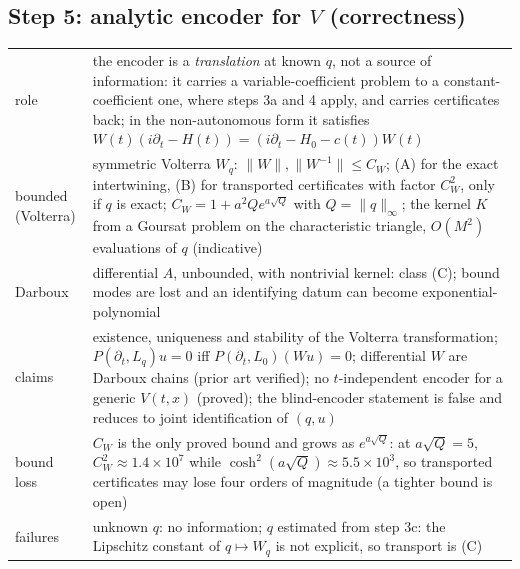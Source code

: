 \subsection*{Step 5: analytic encoder for $V$ (correctness)}
\begin{tabular}{@{}p{2.2cm}p{9.6cm}@{}}
\toprule
role & the encoder is a \emph{translation} at known $q$, not a source of information: it carries a variable-coefficient problem to a constant-coefficient one, where steps 3a and 4 apply, and carries certificates back; in the non-autonomous form it satisfies $W(t)(i\partial_t-H(t))=(i\partial_t-H_0-c(t))W(t)$\\
bounded (Volterra) & symmetric Volterra $W_q$: $\lVert W\rVert,\lVert W^{-1}\rVert\le C_W$; (A) for the exact intertwining, (B) for transported certificates with factor $C_W^2$, only if $q$ is exact; $C_W=1+a^2Qe^{a\sqrt Q}$ with $Q=\lVert q\rVert_\infty$; the kernel $K$ from a Goursat problem on the characteristic triangle, $O(M^2)$ evaluations of $q$ (indicative)\\
Darboux & differential $A$, unbounded, with nontrivial kernel: class (C); bound modes are lost and an identifying datum can become exponential-polynomial\\
claims & existence, uniqueness and stability of the Volterra transformation; $P(\partial_t,L_q)u=0$ iff $P(\partial_t,L_0)(Wu)=0$; differential $W$ are Darboux chains (prior art verified); no $t$-independent encoder for a generic $V(t,x)$ (proved); the blind-encoder statement is false and reduces to joint identification of $(q,u)$\\
bound loss & $C_W$ is the only proved bound and grows as $e^{a\sqrt Q}$: at $a\sqrt Q=5$, $C_W^2\approx1.4\times10^7$ while $\cosh^2(a\sqrt Q)\approx5.5\times10^3$, so transported certificates may lose four orders of magnitude (a tighter bound is open)\\
failures & unknown $q$: no information; $q$ estimated from step 3c: the Lipschitz constant of $q\mapsto W_q$ is not explicit, so transport is (C)\\
\bottomrule
\end{tabular}

